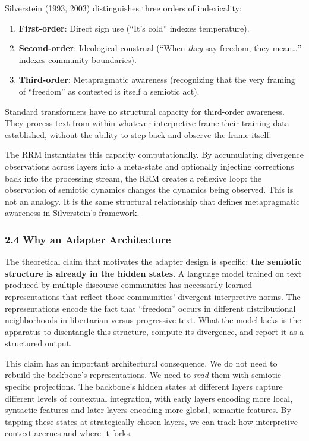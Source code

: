 \documentclass[
  11pt]{article}
\providecommand{\tightlist}{%
  \setlength{\itemsep}{0pt}\setlength{\parskip}{0pt}}
\begin{document}
Silverstein (1993, 2003) distinguishes three orders of indexicality:

\begin{enumerate}
\def\labelenumi{\arabic{enumi}.}
\tightlist
\item
  \textbf{First-order}: Direct sign use (``It's cold'' indexes
  temperature).
\item
  \textbf{Second-order}: Ideological construal (``When \emph{they} say
  freedom, they mean\ldots{}'' indexes community boundaries).
\item
  \textbf{Third-order}: Metapragmatic awareness (recognizing that the
  very framing of ``freedom'' as contested is itself a semiotic act).
\end{enumerate}

Standard transformers have no structural capacity for third-order
awareness. They process text from within whatever interpretive frame
their training data established, without the ability to step back and
observe the frame itself.

The RRM instantiates this capacity computationally. By accumulating
divergence observations across layers into a meta-state and optionally
injecting corrections back into the processing stream, the RRM creates a
reflexive loop: the observation of semiotic dynamics changes the
dynamics being observed. This is not an analogy. It is the same
structural relationship that defines metapragmatic awareness in
Silverstein's framework.

\subsubsection{2.4 Why an Adapter
Architecture}\label{why-an-adapter-architecture}

The theoretical claim that motivates the adapter design is specific:
\textbf{the semiotic structure is already in the hidden states}. A
language model trained on text produced by multiple discourse
communities has necessarily learned representations that reflect those
communities' divergent interpretive norms. The representations encode
the fact that ``freedom'' occurs in different distributional
neighborhoods in libertarian versus progressive text. What the model
lacks is the apparatus to disentangle this structure, compute its
divergence, and report it as a structured output.

This claim has an important architectural consequence. We do not need to
rebuild the backbone's representations. We need to \emph{read} them with
semiotic-specific projections. The backbone's hidden states at different
layers capture different levels of contextual integration, with early
layers encoding more local, syntactic features and later layers encoding
more global, semantic features. By tapping these states at strategically
chosen layers, we can track how interpretive context accrues and where
it forks.
\end{document}
